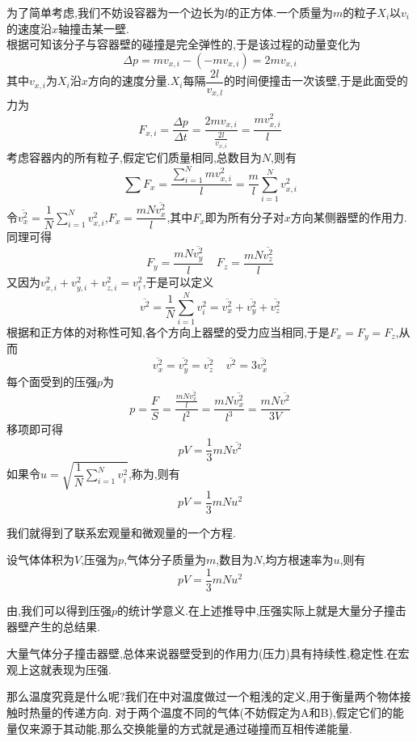 \documentclass{ctexart}
\begin{document}
\begin{derivation}
    为了简单考虑,我们不妨设容器为一个边长为$l$的正方体.一个质量为$m$的粒子$X_i$以$v_i$的速度沿$x$轴撞击某一壁.\\
    根据可知该分子与容器壁的碰撞是完全弹性的,于是该过程的动量变化为
    \[\Delta p=mv_{x,i}-\left(-mv_{x,i}\right)=2mv_{x,i}\]
    其中$v_{x,i}$为$X_i$沿$x$方向的速度分量.$X_i$每隔$\dfrac{2l}{v_{x,l}}$的时间便撞击一次该壁,于是此面受的力为
    \[F_{x,i}=\dfrac{\Delta p}{\Delta t}=\dfrac{2mv_{x,i}}{\frac{2l}{v_{x,i}}}=\dfrac{mv_{x,i}^2}{l}\]
    考虑容器内的所有粒子,假定它们质量相同,总数目为$N$,则有
    \[\sum F_x=\dfrac{\displaystyle \sum_{i=1}^{N}mv_{x,i}^2}{l}=\dfrac ml\sum_{i=1}^{N}v_{x,i}^2\]
    令$\displaystyle \overline{v_x^2}=\dfrac{1}{N}\sum_{i=1}^{N}v_{x,i}^2$,$F_x=\dfrac{mN\overline{v_x^2}}{l}$,其中$F_x$即为所有分子对$x$方向某侧器壁的作用力.同理可得
    \[F_y=\dfrac{mN\overline{v_y^2}}{l}\ \ \ \ \ F_z=\dfrac{mN\overline{v_z^2}}{l}\]
    又因为$v_{x,i}^2+v_{y,i}^2+v_{z,i}^2=v_i^2$,于是可以定义
    \[\overline{v^2}=\dfrac{1}{N}\sum_{i=1}^{N}v_i^2=\overline{v_x^2}+\overline{v_y^2}+\overline{v_z^2}\]
    根据和正方体的对称性可知,各个方向上器壁的受力应当相同,于是$F_x=F_y=F_z$,从而
    \[\overline{v_x^2}=\overline{v_y^2}=\overline{v_z^2}\ \ \ \ \ \overline{v^2}=3\overline{v_x^2}\]
    每个面受到的压强$p$为
    \[p=\dfrac{F}{S}=\dfrac{\frac{mN\overline{v_x^2}}{l}}{l^2}=\dfrac{mN\overline{v_x^2}}{l^3}=\dfrac{mN\overline{v^2}}{3V}\]
    移项即可得
    \[pV=\dfrac13mN\overline{v^2}\]
    如果令$u=\sqrt{\dfrac1N\displaystyle\sum_{i=1}^{N}v_i^2}$,称为,则有
    \[pV=\dfrac13mNu^2\]

\end{derivation}
我们就得到了联系宏观量和微观量的一个方程.
\begin{theorem}[1B.1.2 气体分子动理论的基本方程]
    设气体体积为$V$,压强为$p$,气体分子质量为$m$,数目为$N$,均方根速率为$u$,则有
    \[pV=\dfrac13mNu^2\]

\end{theorem}
\indent 由,我们可以得到压强$p$的统计学意义.在上述推导中,压强实际上就是大量分子撞击器壁产生的总结果.
\begin{theorem}[1B.1.3 压强的统计学意义]
    大量气体分子撞击器壁,总体来说器壁受到的作用力(压力)具有持续性,稳定性.在宏观上这就表现为压强.
\end{theorem}
那么温度究竟是什么呢?我们在中对温度做过一个粗浅的定义,用于衡量两个物体接触时热量的传递方向.%
对于两个温度不同的气体(不妨假定为A和B),假定它们的能量仅来源于其动能,那么交换能量的方式就是通过碰撞而互相传递能量.%
\end{document}
